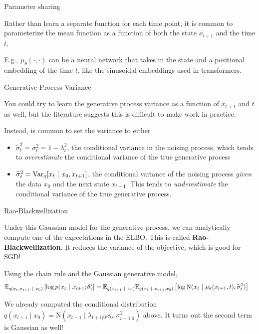 \documentclass[aspectratio=169]{beamer}
\begin{document}
\begin{frame}[t,allowframebreaks]{Parameter sharing}
    
    Rather than learn a separate
function for each time point, it is common to parameterize the mean
function as a function of both the state \(x_{t+1}\) and the time \(t\).

E.g., \(\mu_\theta(\cdot, \cdot)\) can be a neural network that
takes in the state and a positional embedding of the time \(t\), like
the sinusoidal embeddings used in transformers. 
\end{frame}

\begin{frame}[t,allowframebreaks]{Generative Process Variance}

    You could try to learn the
generative process variance as a function of \(x_{t+1}\) and \(t\) as
well, but the literature suggests this is difficult to make work in
practice. 

Instead, is common to set the variance to either 
\begin{itemize}
    \item \(\widetilde{\sigma}_t^2 = \sigma_t^2 = 1-\lambda_t^2\), the conditional
variance in the noising process, which tends to \emph{overestimate} the
conditional variance of the true generative process
    \item  \(\widetilde{\sigma}_t^2 = \textrm{Var}_q[x_t ~\vert~ x_0, x_{t+1}]\), the
conditional variance of the noising process \emph{given} the data
\(x_0\) and the next state \(x_{t+1}\). This tends to
\emph{underestimate} the conditional variance of the true generative
process. 
\end{itemize}

\end{frame}

\begin{frame}[t,allowframebreaks]{Rao-Blackwellization}\label{rao-blackwellization}

Under this Gaussian model for the generative process, we can
analytically compute one of the expectations in the ELBO. This is called
\textbf{Rao-Blackwellization}. It reduces the variance of the objective, which is
good for SGD!

Using the chain rule and the Gaussian generative model,
\begin{align*}
\mathbb{E}_{q(x_t, x_{t+1} ~\vert~ x_0)} \left[ \log p(x_t ~\vert~ x_{t+1}; \theta) \right] 
&= \mathbb{E}_{q(x_{t+1} ~\vert~ x_0)} \mathbb{E}_{q(x_t ~\vert~ x_{t+1}, x_0)} \left[\log \mathrm{N}(x_t ~\vert~ \mu_\theta(x_{t+1}, t), \widetilde{\sigma}_t^2) \right]
\end{align*}

We already computed the conditional distribution
\(q(x_{t+1} \mid x_0) = \mathrm{N}(x_{t+1} \mid \lambda_{t+1|0} x_0, \sigma_{t+1|0}^2)\)
above. It turns out the second term is Gaussian as well!
\end{frame}
\end{document}
